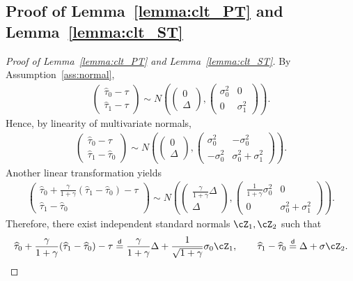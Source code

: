 \documentclass[11pt]{article}
\newcommand{\htau}{\widehat\tau}
\numberwithin{equation}{section}
\theoremstyle{definition}
\begin{document}
\subsection{Proof of Lemma~\ref{lemma:clt_PT} and Lemma~\ref{lemma:clt_ST}}

\begin{proof}[Proof of Lemma~\ref{lemma:clt_PT} and Lemma~\ref{lemma:clt_ST}]

By Assumption~\ref{ass:normal},
\begin{align*}
  \begin{pmatrix} \htau_0-\tau \\ \htau_1-\tau \end{pmatrix} \sim N\left(\begin{pmatrix} 0 \\ \Delta\end{pmatrix}, \begin{pmatrix} \sigma_0^2 & 0 \\
    0 & \sigma_1^2
  \end{pmatrix}\right).
\end{align*}
Hence, by linearity of multivariate normals,
\begin{align*}
  \begin{pmatrix} \htau_0-\tau \\ \htau_1-\htau_0 \end{pmatrix} \sim N\left(\begin{pmatrix} 0 \\ \Delta\end{pmatrix}, \begin{pmatrix} \sigma_0^2 & -\sigma_0^2 \\
  -\sigma_0^2 & \sigma_0^2 + \sigma_1^2
  \end{pmatrix}\right).
\end{align*}
Another linear transformation yields
\begin{align*}
  \begin{pmatrix} \htau_0 + \frac{\gamma}{1+\gamma} (\htau_1-\htau_0)-\tau \\ \htau_1-\htau_0 \end{pmatrix} \sim N\left(\begin{pmatrix} \frac{\gamma}{1+\gamma} \Delta \\ \Delta\end{pmatrix}, \begin{pmatrix} \frac{1}{1+\gamma} \sigma_0^2 & 0 \\
  0 & \sigma_0^2 + \sigma_1^2
  \end{pmatrix}\right).
\end{align*}
Therefore, there exist independent standard normals $\cZ_1,\cZ_2$ such that
\[
\htau_0 + \frac{\gamma}{1+\gamma} (\htau_1-\htau_0)-\tau \stackrel{\sf d}{=} \frac{\gamma}{1+\gamma}\Delta + \frac{1}{\sqrt{1+\gamma}}\sigma_0\cZ_1,
\qquad
\htau_1-\htau_0 \stackrel{\sf d}{=} \Delta + \sigma \cZ_2.
\]


\end{proof}
\end{document}
